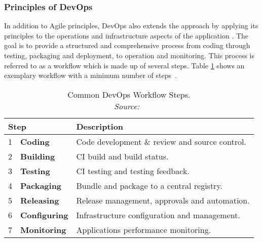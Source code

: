         \subsubsection{Principles of DevOps}\label{ssec::devops_princibles}
        In addition to Agile principles, DevOps also extends the  approach by applying its principles to the operations and infrastructure aspects of the application \cite{effective_devops}. The goal is to provide a structured and comprehensive process from coding through testing, packaging and deployment, to operation and monitoring. This process is referred to as a workflow which is made up of several steps. Table \ref{tab::devops_steps} shows an exemplary workflow with a minimum number of steps~\cite{base_devops}.

        \begin{table}[]
            \centering
            \begin{tabularx}{0.85\textwidth}{llX}
                \multicolumn{2}{l}{Step} & Description \\ \midrule\midrule
                1 & \textbf{Coding}& Code development \& review and source control.  \\
                2 & \textbf{Building}& \acs{CI} build and build status.  \\
                3 & \textbf{Testing}& \acs{CI} testing and testing feedback.  \\
                4 & \textbf{Packaging}& Bundle and package to a central registry.  \\
                5 & \textbf{Releasing}& Release management, approvals and automation.  \\
                6 & \textbf{Configuring}& Infrastructure configuration and management.  \\
                7 & \textbf{Monitoring}& Applications performance monitoring.  \\
            \end{tabularx}
            \caption{Common DevOps Workflow Steps. \\\textit{Source:~\cite{base_devops}}}
            \label{tab::devops_steps}
        \end{table}

